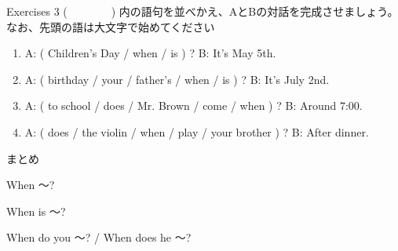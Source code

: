 \documentclass[aspectratio=169,xcolor={dvipsnames,table}]{beamer}
\begin{document}
\begin{frame}[plain]{Exercises 3}
 (~~~~~~~~) 内の語句を並べかえ、AとBの対話を完成させましょう。なお、先頭の語は大文字で始めてください

\begin{enumerate}
 \item A: ( Children's Day / when / is ) ? 
\hspace{137.4pt}B: It's May 5th.\\
\phantom{A: }
 \item A: ( birthday / your / father's / when / is ) ?
\hspace{83.5pt}B: It's July 2nd.\\
\phantom{A: }
 \item A: ( to school / does / Mr. Brown / come / when ) ?
\hspace{47pt}B: Around 7:00.\\
\phantom{A: }
 \item A: ( does / the violin / when / play / your brother ) ?
\hspace{39.7pt}B: After dinner.\\
\phantom{A: }
\end{enumerate}

\mbox{}\hfill{}

\end{frame}
\begin{frame}[plain]{まとめ}
 \begin{block}{When ～?}
\begin{description}[　　　　]
 \item[be動詞] When is ～?
 \item[一般動詞] When do you ～? / When does he ～?
\end{description}
  
 \end{block}
\end{frame}
\end{document}
